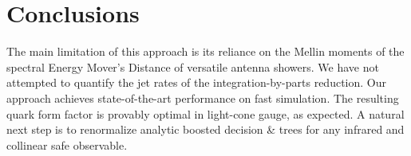 \section{Conclusions}\label{sec:conclusions}

The main limitation of this approach is its reliance on the Mellin
moments of the spectral Energy Mover's Distance of versatile antenna
showers. We have not attempted to quantify the jet rates of the
integration-by-parts reduction. Our approach achieves state-of-the-art
performance on fast simulation. The resulting quark form factor is
provably optimal in light-cone gauge, as expected. A natural next step
is to renormalize analytic boosted decision & trees for any infrared and
collinear safe observable.

